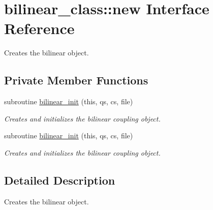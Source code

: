 \hypertarget{interfacebilinear__class_1_1new}{\section{bilinear\+\_\+class\+:\+:new Interface Reference}
\label{interfacebilinear__class_1_1new}
}


Creates the bilinear object.  


\subsection*{Private Member Functions}
\begin{DoxyCompactItemize}
\item 
subroutine \hyperlink{interfacebilinear__class_1_1new_a860c1a5d7e94a09db9c487de818f39e7}{bilinear\+\_\+init} (this, qs, cs, file)
\begin{DoxyCompactList}\small\item\em Creates and initializes the bilinear coupling object. \end{DoxyCompactList}\item 
subroutine \hyperlink{interfacebilinear__class_1_1new_a860c1a5d7e94a09db9c487de818f39e7}{bilinear\+\_\+init} (this, qs, cs, file)
\begin{DoxyCompactList}\small\item\em Creates and initializes the bilinear coupling object. \end{DoxyCompactList}\end{DoxyCompactItemize}


\subsection{Detailed Description}
Creates the bilinear object. 

